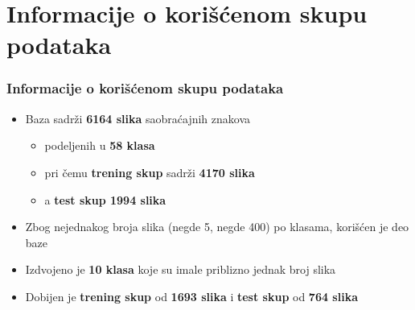 \documentclass{beamer}
\begin{document}
\section{Informacije o korišćenom skupu podataka}
\begin{frame}
\frametitle{Informacije o korišćenom skupu podataka}

\begin{itemize}
\item Baza sadrži \textbf{6164 slika} saobraćajnih znakova
\begin{itemize}
\item podeljenih u \textbf{58 klasa}
\item pri čemu \textbf{trening skup} sadrži \textbf{4170 slika}
\item a \textbf{test skup 1994 slika}
\end{itemize}
\item Zbog nejednakog broja slika (negde 5, negde 400) po klasama, korišćen je deo baze
\item Izdvojeno je \textbf{10 klasa} koje su imale priblizno jednak broj slika
\item Dobijen je \textbf{trening skup} od \textbf{1693 slika} i \textbf{test skup} od \textbf{764 slika}



\end{itemize}

\end{frame}



\end{document}
